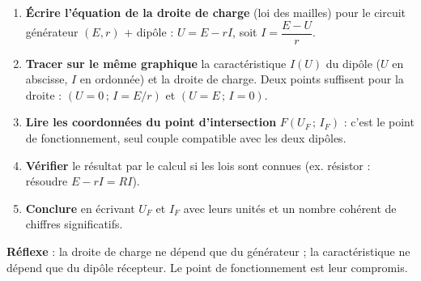 \documentclass[11pt]{article}
\newcommand{\cle}[1]{{\popxbold\color{popdark}#1}}
\begin{document}
\begin{methode}
\begin{enumerate}
\item \textbf{Écrire l'équation de la droite de charge} (loi des mailles) pour le circuit générateur $(E, r)$ + dipôle : $U = E - rI$, soit $I = \dfrac{E - U}{r}$.
\item \textbf{Tracer sur le même graphique} la caractéristique $I(U)$ du dipôle ($U$ en abscisse, $I$ en ordonnée) et la droite de charge. Deux points suffisent pour la droite : $(U = 0\,;\,I = E/r)$ et $(U = E\,;\,I = 0)$.
\item \textbf{Lire les coordonnées du point d'intersection} $F(U_F\,;\,I_F)$ : c'est le \cle{point de fonctionnement}, seul couple compatible avec les deux dipôles.
\item \textbf{Vérifier} le résultat par le calcul si les lois sont connues (ex. résistor : résoudre $E - rI = RI$).
\item \textbf{Conclure} en écrivant $U_F$ et $I_F$ avec leurs unités et un nombre cohérent de chiffres significatifs.
\end{enumerate}
\textbf{Réflexe} : la droite de charge ne dépend que du générateur ; la caractéristique ne dépend que du dipôle récepteur. Le point de fonctionnement est leur compromis.
\end{methode}
\end{document}
